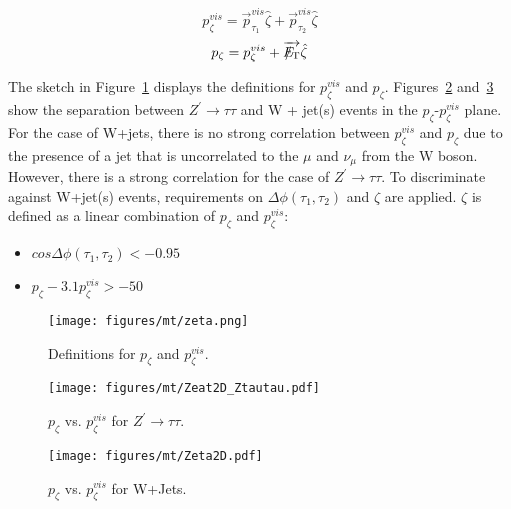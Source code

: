 \begin{equation}
   p_{\zeta}^{vis} = \overrightarrow{p}_{\tau_{1}}^{vis}\hat{\zeta}+\overrightarrow{p}_{\tau_{2}}^{vis}\hat{\zeta}
\label{eq:zetavis}
\end{equation}
\begin{equation}
   p_{\zeta} = p_{\zeta}^{vis}+\overrightarrow{{E\!\!\!\!/_{\rm T}}}\hat{\zeta}
\label{eq:zeta}
\end{equation}

The sketch in Figure~\ref{fig:ZetaDiagram} displays the definitions for $p_{\zeta}^{vis}$ and $p_{\zeta}$. Figures~\ref{fig:WjetsZeta1} and~\ref{fig:WjetsZeta2} 
show the separation between $Z^{\prime}\rightarrow\tau\tau$ and W + jet(s) events in the $p_{\zeta}$-$p_{\zeta}^{vis}$ plane. For the case of W+jets, there is no 
strong correlation between $p_{\zeta}^{vis}$ and $p_{\zeta}$ due to the presence of a jet that is uncorrelated to the $\mu$ and $\nu_{\mu}$ from the W boson. 
However, there is a strong correlation for the case of $Z^{\prime} \to \tau\tau$. To discriminate against W+jet(s) events, requirements on $\Delta \phi 
(\tau_{1},\tau_{2})$ and $\zeta$ are applied. $\zeta$ is defined as a linear combination of $p_{\zeta}$ and $p_{\zeta}^{vis}$:

\begin{itemize}
  \item $cos\Delta\phi(\tau_{1},\tau_{2}) < -0.95$
  \item $p_{\zeta} - 3.1 p_{\zeta}^{vis} > -50$
\end{itemize}
\begin{figure}
\begin{center}
\texttt{[image: figures/mt/zeta.png]}
\caption{ Definitions for $p_{\zeta}$ and $p_{\zeta}^{vis}$.}
\label{fig:ZetaDiagram}
\end{center}
\end{figure}
\begin{figure}
\begin{center}
\texttt{[image: figures/mt/Zeat2D\_Ztautau.pdf]}
\caption{ $p_{\zeta}$ vs. $p_{\zeta}^{vis}$ for $Z^{\prime}\rightarrow\tau\tau$.}
\label{fig:WjetsZeta1}
\end{center}
\end{figure}
\begin{figure}
\begin{center}
\texttt{[image: figures/mt/Zeta2D.pdf]}
\caption{ $p_{\zeta}$ vs. $p_{\zeta}^{vis}$ for W+Jets.}
\label{fig:WjetsZeta2}
\end{center}
\end{figure}

